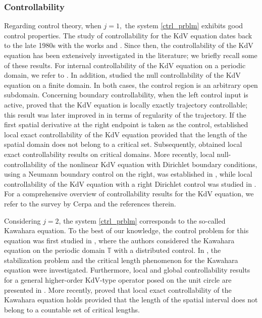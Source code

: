 \documentclass[10pt, reqno]{amsart}
\numberwithin{equation}{section}
\begin{document}
\subsubsection{Controllability} Regarding control theory, when $j = 1,$ the system \eqref{ctrl_prblm} exhibits good control properties. The study of controllability for the KdV equation dates back to the late 1980s with the works \cite{Russell_1991} and \cite{Zhang_1990_thesis}. Since then, the controllability of the KdV equation has been extensively investigated in the literature; we briefly recall some of these results. For internal controllability of the KdV equation on a periodic domain, we refer to \cite{Russell_Zhang_1993, Russell_Zang_1996, Rosier_10}. In addition, \cite{Capistrano_Roberto_2015} studied the null controllability of the KdV equation on a finite domain. In both cases, the control region is an arbitrary open subdomain. Concerning boundary controllability, when the left control input is active, \cite{Rosier_2004} proved that the KdV equation is locally exactly trajectory controllable; this result was later improved in \cite{Glass_Guerrero_2009} in terms of regularity of the trajectory. If the first spatial derivative at the right endpoint is taken as the control, \cite{Rosier_1997} established local exact controllability of the KdV equation provided that the length of the spatial domain does not belong to a critical set. Subsequently, \cite{Coron_2004,Cerpa_2007, Cerpa_Crepeau_2009} obtained local exact controllability results on critical domains. More recently, local null-controllability of the nonlinear KdV equation with Dirichlet boundary conditions, using a Neumann boundary control on the right, was established in \cite{Coron_Koenig_Nguyen_24}, while local controllability of the KdV equation with a right Dirichlet control was studied in \cite{Nguyen_2025}. For a comprehensive overview of controllability results for the KdV equation, we refer to the survey by Cerpa \cite{Cerpa_2014} and the references therein.


Considering \( j = 2 \), the system \eqref{ctrl_prblm} corresponds to the so-called Kawahara equation. To the best of our knowledge, the control problem for this equation was first studied in \cite{Zhang_Zhao_2012, Zhang_Zhao_2015}, where the authors considered the Kawahara equation on the periodic domain \( \mathbb{T} \) with a distributed control. In \cite{Araruna_Capistrano_Doronin_2012}, the stabilization problem and the critical length phenomenon for the Kawahara equation were investigated.  Furthermore, local and global controllability results for a general higher-order KdV-type operator posed on the unit circle are presented in \cite{Roberto_Kwak_Leal_2022}. More recently, \cite{Araruna_Doronin_Rosier_2026} proved that local exact controllability of the Kawahara equation holds provided that the length of the spatial interval does not belong to a countable set of critical lengths.
\end{document}
